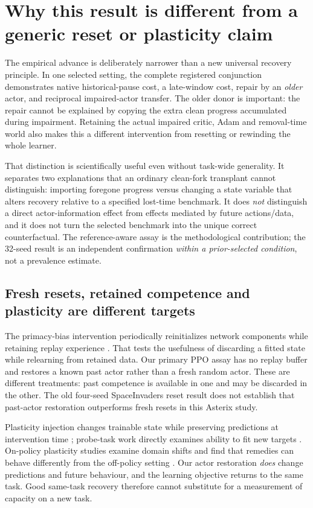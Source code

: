 \section{Why this result is different from a generic reset or plasticity claim}\label{m:contribution}
The empirical advance is deliberately narrower than a new universal recovery principle. In one selected setting, the complete registered conjunction demonstrates native historical-pause cost, a late-window cost, repair by an \emph{older} actor, and reciprocal impaired-actor transfer. The older donor is important: the repair cannot be explained by copying the extra clean progress accumulated during impairment. Retaining the actual impaired critic, Adam and removal-time world also makes this a different intervention from resetting or rewinding the whole learner.

That distinction is scientifically useful even without task-wide generality. It separates two explanations that an ordinary clean-fork transplant cannot distinguish: importing foregone progress versus changing a state variable that alters recovery relative to a specified lost-time benchmark. It does \emph{not} distinguish a direct actor-information effect from effects mediated by future actions/data, and it does not turn the selected benchmark into the unique correct counterfactual. The reference-aware assay is the methodological contribution; the 32-seed result is an independent confirmation \emph{within a prior-selected condition}, not a prevalence estimate.

\subsection{Fresh resets, retained competence and plasticity are different targets}
The primacy-bias intervention periodically reinitializes network components while retaining replay experience \citep{nikishin2022primacy}. That tests the usefulness of discarding a fitted state while relearning from retained data. Our primary PPO assay has no replay buffer and restores a known past actor rather than a fresh random actor. These are different treatments: past competence is available in one and may be discarded in the other. The old four-seed SpaceInvaders reset result does not establish that past-actor restoration outperforms fresh resets in this Asterix study.

Plasticity injection changes trainable state while preserving predictions at intervention time \citep{nikishin2023injection}; probe-task work directly examines ability to fit new targets \citep{lyle2023plasticity}. On-policy plasticity studies examine domain shifts and find that remedies can behave differently from the off-policy setting \citep{juliani2024onpolicy}. Our actor restoration \emph{does} change predictions and future behaviour, and the learning objective returns to the same task. Good same-task recovery therefore cannot substitute for a measurement of capacity on a new task.

